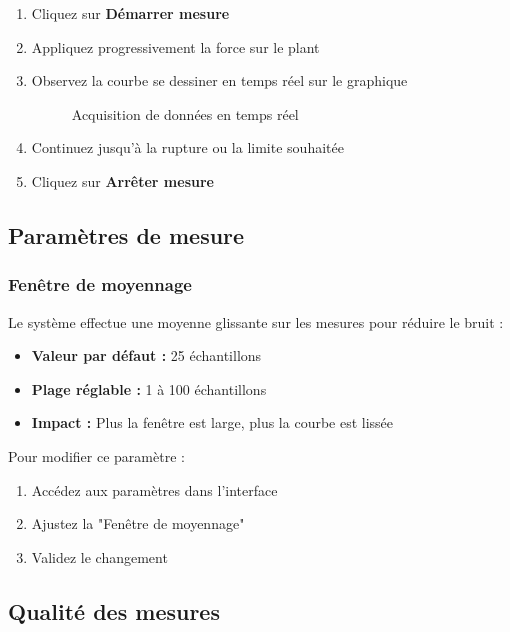 \documentclass[12pt,a4paper]{article}
\begin{document}
\begin{enumerate}
    \item Cliquez sur \textbf{Démarrer mesure}
    \item Appliquez progressivement la force sur le plant
    \item Observez la courbe se dessiner en temps réel sur le graphique
    \begin{figure}[H]
        \centering
        \caption{Acquisition de données en temps réel}
        \label{fig:mesure_cours}
    \end{figure}
    
    \item Continuez jusqu'à la rupture ou la limite souhaitée
    \item Cliquez sur \textbf{Arrêter mesure}
\end{enumerate}

\subsection{Paramètres de mesure}

\subsubsection{Fenêtre de moyennage}

Le système effectue une moyenne glissante sur les mesures pour réduire le bruit :
\begin{itemize}
    \item \textbf{Valeur par défaut :} 25 échantillons
    \item \textbf{Plage réglable :} 1 à 100 échantillons
    \item \textbf{Impact :} Plus la fenêtre est large, plus la courbe est lissée
\end{itemize}

Pour modifier ce paramètre :
\begin{enumerate}
    \item Accédez aux paramètres dans l'interface
    \item Ajustez la "Fenêtre de moyennage"
    \item Validez le changement
\end{enumerate}

\subsection{Qualité des mesures}
\end{document}
